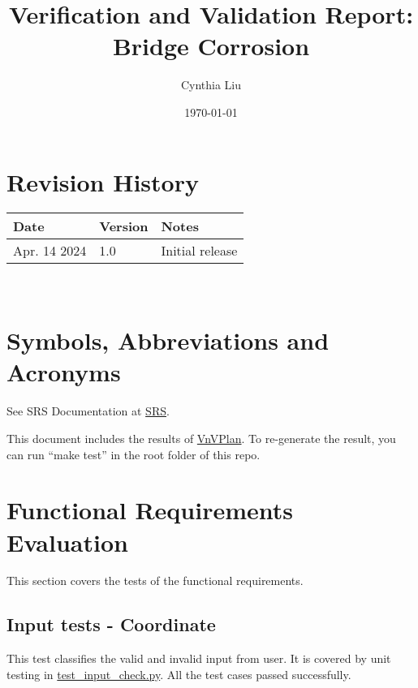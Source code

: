 \documentclass[12pt, titlepage]{article}
\begin{document}
\title{Verification and Validation Report: Bridge Corrosion} 
\author{Cynthia Liu}
\date{\today}
	
\maketitle


\section{Revision History}

\begin{tabularx}{\textwidth}{p{3cm}p{2cm}X}
\toprule {\bf Date} & {\bf Version} & {\bf Notes}\\
\midrule
Apr. 14 2024 & 1.0 & Initial release\\
\bottomrule
\end{tabularx}

~\newpage

\section{Symbols, Abbreviations and Acronyms}
See SRS Documentation at \href{https://github.com/CynthiaLiu0805/BridgeCorrosion/blob/main/docs/SRS/SRS.pdf}{SRS}.



\newpage

\tableofcontents

\listoftables %

\listoffigures %

\newpage


This document includes the results of \href{https://github.com/CynthiaLiu0805/BridgeCorrosion/blob/main/docs/VnVPlan/VnVPlan.pdf}{VnVPlan}. To re-generate the result, you can run ``make test'' in the root folder of this repo. 

\section{Functional Requirements Evaluation}
This section covers the tests of the functional requirements.
\subsection{Input tests - Coordinate}
This test classifies the valid and invalid input from user. It is covered by unit testing in \href{https://github.com/CynthiaLiu0805/BridgeCorrosion/blob/main/src/app/test_input_check.py}{test\_input\_check.py}. All the test cases passed successfully. 
\end{document}
